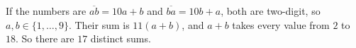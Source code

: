If the numbers are $\overline{ab}=10a+b$ and $\overline{ba}=10b+a$, both are two-digit, so $a,b\in\{1,\dots,9\}$. Their sum is $11(a+b)$, and $a+b$ takes every value from $2$ to $18$. So there are $\boxed{17}$ distinct sums.
